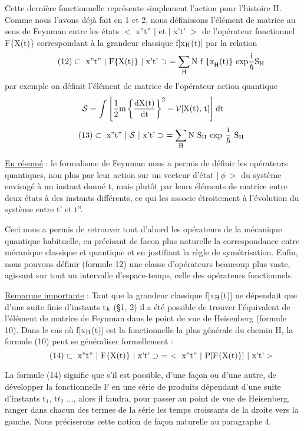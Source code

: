 Cette dernière fonctionnelle représente simplement l'action
pour l'histoire H. Comme nous l'avons déjà fait en 1 et 2, nous définissons
l'élément de matrice au sens de Feynman entre les états $<$ x''t'' $|$ et $|$ x't' $>$
de l'opérateur fonctionnel F\{X(t)\} correspondant à la grandeur classique f$[$x$_{\text{H}}$(t)$]$
par la relation
\[
\tag{12}\subset \text{ x''t'' }|\text{ F\{X(t)\} }|\text{ x't'}\supset\ =
\sum_{\text{H}} \text{N f \{x}_{\text{H}}(\text{t})\}\text{ exp}\frac{\text{i}}{\hbar}\text{S}_{\text{H}}
\]
par exemple on définit l'élément de matrice de l'opérateur action quantique
\[
\mathcal{S}=\int\left[\frac{1}{2}\text{m}\left\{\frac{\text{dX(t)}}{\text{dt}}\right\}^2-\mathcal{V}[\text{X(t), t}]\right]\text{dt}
\]
\[
\tag{13}\subset \text{ x''t'' }|\ \mathcal{S}\ |\text{ x't'}\supset\ =
\sum_{\text{H}} \text{N S}_{\text{H}}\text{ exp }\frac{\text{i}}{\hbar}\text{ S}_{\text{H}}
\]

\ul{En résumé} : le formalisme de Feynman nous a permis de définir les opérateurs
quantiques, non plus par leur action sur un vecteur d'état $|\ \phi\ >$ du système
envisagé à un instant donné t, mais plutôt par leurs éléments de matrice
entre deux états à des instants différents, ce qui les associe étroitement
à l'évolution du système entre t' et t''.

Ceci nous a permis de retrouver tout d'abord les opérateurs de
la mécanique quantique habituelle, en précisant de facon plus naturelle la
correspondance entre mécanique classique et quantique et en justifiant la
règle de symétrisation. Enfin, nous pouvons définir (formule 12) une classe
d'opérateurs beaucoup plus vaste, agissant sur tout un intervalle d'espace-temps, celle des opérateurs fonctionnels.

\ul{Remarque importante} : 
Tant que la grandeur classique f$[$x$_{\text{H}}$(t)$]$ ne dépendait que d'une suite finie
d'instants t$_{\text{k}}$ (\S 1, 2) il a été possible de trouver l'équivalent de l'élément
de matrice de Feynman dans le point de vue de Heisenberg (formule 10). Dans
le cas où f$[$x$_{\text{H}}$(t)$]$ est la fonctionnelle la plus générale du chemin H, la
formule (10) peut se généraliser formellement :
\[
\tag{14}\subset \mt{ x''t'' }|\ \mt{F}\mt{\{X(t)\}}\ |\mt{ x't'}\supset\ =\ 
<\mt{ x''t'' }|\ \mt{P}[\mt{F}\mt{\{X(t)\}}]\ |\mt{ x't'}>
\]

La formule (14) signifie que s'il est possible, d'une façon ou d'une autre,
de développer la fonctionnelle F en une série de produits dépendant d'une
suite d'instants t$_1$, t$t_2$ ..., alors il faudra, pour passer au point de vue
de Heisenberg, ranger dans chacun des termes de la série les temps croissants
de la droite vers la gauche. Nous préciserons cette notion de façon naturelle
au paragraphe 4.

